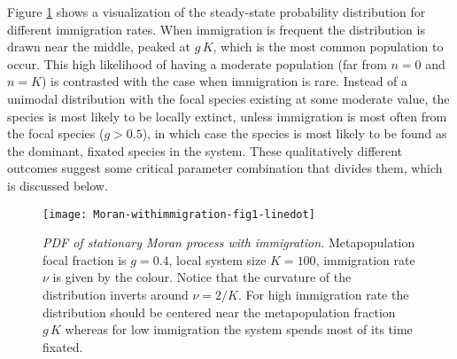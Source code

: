 Figure \ref{stationary-fig2} shows a visualization of the steady-state probability distribution for different immigration rates. %
When immigration is frequent the distribution is drawn near the middle, peaked at $g\,K$, which is the most common population to occur. 
This high likelihood of having a moderate population (far from $n=0$ and $n=K$) is contrasted with the case when immigration is rare. 
Instead of a unimodal distribution with the focal species existing at some moderate value, the species is most likely to be locally extinct, unless immigration is most often from the focal species ($g>0.5$), in which case the species is most likely to be found as the dominant, fixated species in the system. 
These qualitatively different outcomes suggest some critical parameter combination that divides them, which is discussed below. 
\setlength{\unitlength}{1.0cm}
\begin{figure}[h]
	\centering
	\texttt{[image: Moran-withimmigration-fig1-linedot]}
	\caption{\emph{PDF of stationary Moran process with immigration.} Metapopulation focal fraction is $g=0.4$, local system size $K=100$, immigration rate $\nu$ is given by the colour. Notice that the curvature of the distribution inverts around $\nu=2/K$. For high immigration rate the distribution should be centered near the metapopulation fraction $g\,K$ whereas for low immigration the system spends most of its time fixated. } \label{stationary-fig2}
\end{figure}%

